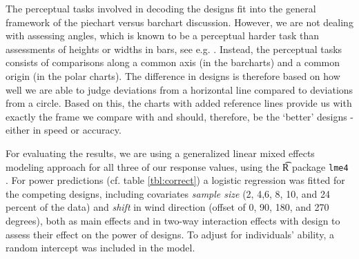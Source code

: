 The perceptual tasks involved in decoding the designs fit into the general framework of the piechart versus barchart discussion. However, we are not dealing with assessing angles, which is known to be a perceptual harder task than assessments of heights or widths in bars, see e.g. \cite{cleveland:1984, robbins:2004, Kosslyn:2006, few:2009}. Instead, the perceptual tasks consists of comparisons along a common axis (in the barcharts) and a common origin (in the polar charts). The difference in designs is therefore based on how well we are able to judge deviations from a horizontal line compared to deviations from a circle. Based on this, the charts with added reference lines provide us with exactly the frame we compare with and should, therefore, be the `better' designs - either in speed or accuracy.



For evaluating the results, we are using a generalized linear mixed effects modeling  approach \cite{pinheiro:2000} for all three of our response values, using the {\t R} package {\tt lme4} \cite{bates:2011}. 
For power predictions (cf. table \ref{tbl:correct}) a logistic regression was fitted for the competing designs, including covariates {\it sample size} (2, 4,6, 8, 10, and 24 percent of the data) and {\it shift} in wind direction (offset of 0, 90, 180, and 270 degrees), both as main effects and in two-way interaction effects with design to assess their effect on the power of designs. To adjust for individuals' ability, a random intercept was included in the model.

